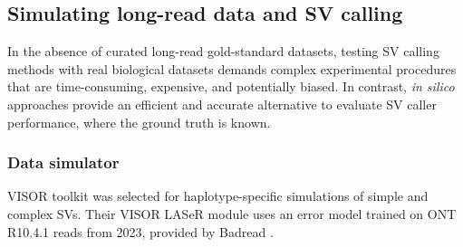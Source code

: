 

\subsection{Simulating long-read data and SV calling}

In the absence of curated long-read gold-standard datasets, testing SV calling methods 
with real biological datasets demands complex experimental procedures that are 
time-consuming, expensive, and potentially biased. In contrast, \textit{in silico} 
approaches provide an efficient and accurate alternative to evaluate SV caller 
performance, where the ground truth is known.


\subsubsection{Data simulator}

VISOR toolkit was selected for haplotype-specific simulations of simple and 
complex SVs. Their VISOR LASeR module uses an error model trained on ONT R10.4.1 
reads from 2023, provided by Badread \cite{wick_badread_2019}.

